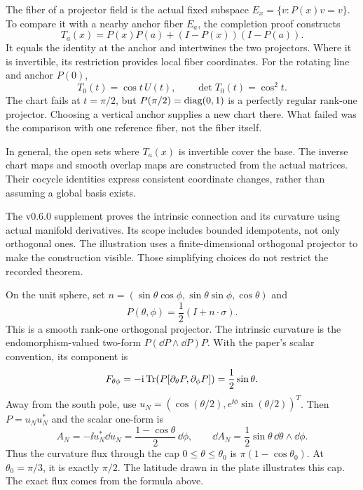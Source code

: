The fiber of a projector field is the actual fixed subspace $E_x=\{v:P(x)v=v\}$. To compare it with a nearby anchor fiber $E_a$, the completion proof constructs
\[
T_a(x)=P(x)P(a)+(I-P(x))(I-P(a)).
\]
It equals the identity at the anchor and intertwines the two projectors. Where it is invertible, its restriction provides local fiber coordinates.
For the rotating line and anchor $P(0)$,
\[
T_0(t)=\cos t\,U(t),\qquad \det T_0(t)=\cos^2t.
\]
The chart fails at $t=\pi/2$, but $P(\pi/2)=\operatorname{diag}(0,1)$ is a perfectly regular rank-one projector. Choosing a vertical anchor supplies a new chart there. What failed was the comparison with one reference fiber, not the fiber itself.

In general, the open sets where $T_a(x)$ is invertible cover the base. The inverse chart maps and smooth overlap maps are constructed from the actual matrices. Their cocycle identities express consistent coordinate changes, rather than assuming a global basis exists.

The v0.6.0 supplement proves the intrinsic connection and its curvature using actual manifold derivatives. Its scope includes bounded idempotents, not only orthogonal ones. The illustration uses a finite-dimensional orthogonal projector to make the construction visible. Those simplifying choices do not restrict the recorded theorem.

On the unit sphere, set $n=(\sin\theta\cos\phi,\sin\theta\sin\phi,\cos\theta)$ and
\[
P(\theta,\phi)=\frac12(I+n\cdot\sigma).
\]
This is a smooth rank-one orthogonal projector. The intrinsic curvature is the endomorphism-valued two-form $P(\dd P\wedge\dd P)P$. With the paper's scalar convention, its component is
\[
F_{\theta\phi}=-\mathrm i\operatorname{Tr}\!\left(P[\partial_\theta P,\partial_\phi P]\right)
=\frac12\sin\theta.
\]
Away from the south pole, use $u_N=(\cos(\theta/2),e^{\ii\phi}\sin(\theta/2))^T$. Then $P=u_Nu_N^*$ and the scalar one-form is
\[
A_N=-\ii u_N^*\dd u_N=\frac{1-\cos\theta}{2}\,\dd\phi,
\qquad \dd A_N=\frac12\sin\theta\,\dd\theta\wedge\dd\phi.
\]
Thus the curvature flux through the cap $0\le\theta\le\theta_0$ is $\pi(1-\cos\theta_0)$. At $\theta_0=\pi/3$, it is exactly $\pi/2$. The latitude drawn in the plate illustrates this cap. The exact flux comes from the formula above.

